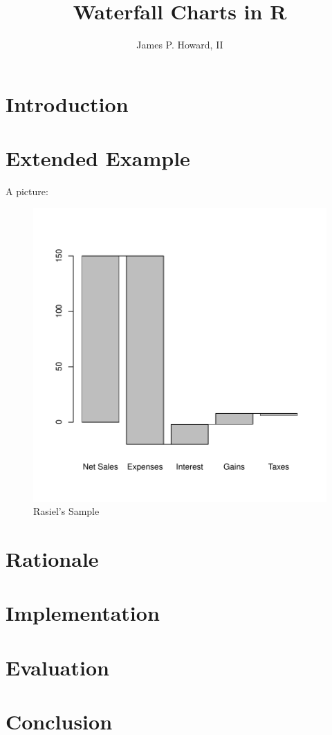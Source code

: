 \documentclass[12pt,letterpaper]{article}
\title{Waterfall Charts in R}
\author{James P. Howard, II}
\begin{document}
\maketitle


\section{Introduction}

\section{Extended Example}
A picture:\autocite{rasiel:1999}

\begin{figure}
\centering  
\includegraphics{waterfall-waterfallplot-rasiel}
\caption{Rasiel's Sample}
\label{fig:rasielplot}
\end{figure}

\section{Rationale}

\section{Implementation}

\section{Evaluation}

\section{Conclusion}

\clearpage
\printbibliography
\end{document}
